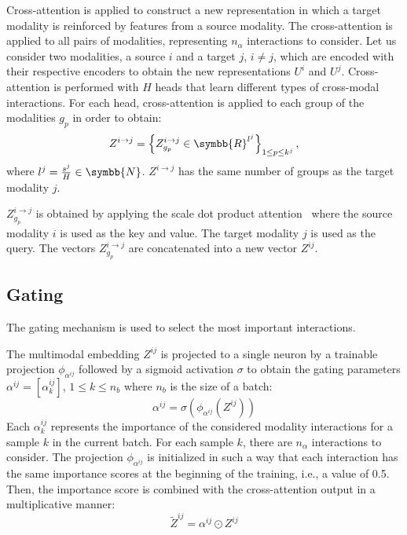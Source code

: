 \documentclass[../main.tex]{subfiles}
\begin{document}
     Cross-attention is applied to construct a new representation in which a target modality is reinforced by features from a source modality.
     The cross-attention is applied to all pairs of modalities, representing \(n_{\alpha}\) interactions to consider.
     Let us consider two modalities, a source \(i\) and a target \(j\), \(i \neq j\), which are encoded with their respective encoders to obtain the new representations \(U^i\) and \(U^j\).
     Cross-attention is performed with $H$ heads that learn different types of cross-modal interactions.
     For each head, cross-attention is applied to each group of the modalities \(g_p\) in order to obtain:
     \[ Z^{i\rightarrow j} = \left\{ Z^{i\rightarrow j}_{g_p} \in \symbb{R}^{l^j} \right\}_{1 \leq p \leq k^j}\text{,}\]
     where $l^j = \frac{s^j}{H} \in \symbb{N}$.
     \( Z^{i\rightarrow j}\) has the same number of groups as the target modality $j$.

     \(Z^{i\rightarrow j}_{g_p}\) is obtained by applying the scale dot product attention~\cite{AttentionAllYouNeed} where the source modality \(i\) is used as the key and value.
     The target modality \(j\) is used as the query.
     The vectors \(Z^{i\rightarrow j}_{g_p}\) are concatenated into a new vector \(Z^{ij}\).

 \subsection{Gating}
     The gating mechanism is used to select the most important interactions.

     The multimodal embedding \(Z^{ij}\) is projected to a single neuron by a trainable projection \(\phi_{\alpha^{ij}}\) followed by a sigmoid activation \(\sigma\) to obtain the gating parameters \(\alpha^{ij} = \left[\alpha^{ij}_{k}\right]\), \(1 \leq k \leq n_b\) where \(n_b\) is the size of a batch:
     \begin{equation}
         \alpha^{ij} = \sigma \left( \phi_{\alpha^{ij}}\left( Z^{ij} \right)\right)
         \label{eq:gate_alpha}
     \end{equation}
     Each \(\alpha^{ij}_{k}\) represents the importance of the considered modality interactions for a sample \(k\) in the current batch.
     For each sample \(k\), there are \(n_{\alpha}\) interactions to consider.
     The projection \(\phi_{\alpha^{ij}}\) is initialized in such a way that each interaction has the same importance scores at the beginning of the training, i.e., a value of 0.5.
     Then, the importance score is combined with the cross-attention output in a multiplicative manner:
     \[ \tilde{Z}^{ij} = \alpha^{ij} \odot Z^{ij} \]
\end{document}
